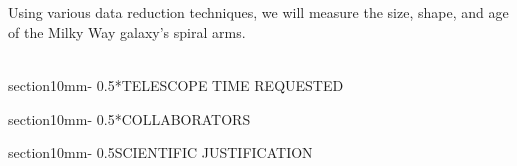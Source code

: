 \documentclass[letterpaper,11pt]{article}
\makeatletter
\renewcommand{\section}{\@startsection%
{section}{1}{0mm}{-\baselineskip}%
{0.5\baselineskip}{\normalfont\Large\bfseries}}%
\newenvironment{Frame}{%
  \noindent\setbox\FrameBox\hbox\bgroup\minipage{1.01\textwidth}\parskip\baselineskip\ignorespaces
}{%
  \endminipage\egroup\fbox{\box\FrameBox}\par
}
\makeatother
\begin{document}
~\\~\\ %

\begin{Frame}
\noindent {\bf \\Abstract}
\smallskip%

Using various data reduction techniques, we will measure the size, shape, and age of the Milky Way galaxy's spiral arms.

\end{Frame}
~\\
\section*{TELESCOPE TIME REQUESTED}

\section*{COLLABORATORS}
\begin{table}[H]\label{tab:collabs}
	\begin{center}
	\end{center}
\end{table}



\section{SCIENTIFIC JUSTIFICATION}
\end{document}
